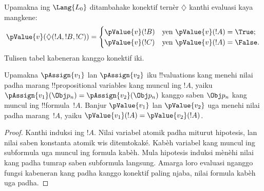 \documentclass[../../../include/open-logic-section]{subfiles}
\begin{document}
\begin{prob}
Upamakna ing $\Lang{L_0}$ ditambahake konektif ternèr
$\diamondsuit$ kanthi evaluasi kaya mangkene:
\begin{gather*}
  \pValue{v}(\diamondsuit( !A , !B , !C ) ) = \begin{cases}
    \pValue{v}( !B ) &
    \text{yen $\pValue{v}(!A) = \True$;}\\
    \pValue{v}( !C ) &
    \text{yen $\pValue{v}(!A) = \False $}.
  \end{cases}
\end{gather*}
Tulisen tabel kabeneran kanggo konektif iki.
\end{prob}

\begin{thm}
 Upamakna $\pAssign{v_1}$ lan
$\pAssign{v_2}$ iku !!{valuation}s kang menehi nilai padha marang
!!{propositional
variable}s kang muncul ing $!A$, yaiku
$\pAssign{v_1}(\Obj p_n) = \pAssign{v_2}(\Obj p_n)$ kanggo saben $\Obj p_n$
kang muncul ing !!{formula}~$!A$. Banjur $\pValue{v_1}$ lan
$\pValue{v_2}$ uga menehi nilai padha marang~$!A$, yaiku
$\pValue{v_1}(!A) = \pValue{v_2}(!A)$.
\end{thm}

\begin{proof}
Kanthi induksi ing $!A$. Nilai variabel atomik padha miturut
hipotesis, lan nilai saben konstanta atomik wis ditemtokaké.
Kabèh variabel kang muncul ing subformula uga muncul ing formula kabèh.
Mula hipotesis induksi mènèhi nilai kang padha tumrap saben subformula
langsung. Amarga loro evaluasi nganggo fungsi kabeneran kang padha
kanggo konektif paling njaba, nilai formula kabèh uga padha.
\end{proof}
\end{document}
